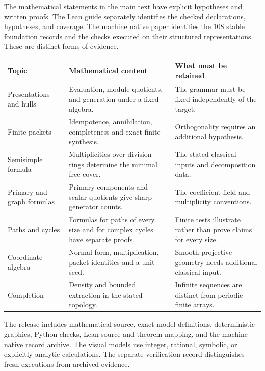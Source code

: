 
The mathematical statements in the main text have explicit hypotheses and written proofs. The Lean guide separately identifies the checked declarations, hypotheses, and coverage. The machine native paper identifies the 108 stable foundation records and the checks executed on their structured representations. These are distinct forms of evidence.

{\small\begin{tabularx}{\linewidth}{@{}>{\raggedright\arraybackslash}p{.23\linewidth}Y>{\raggedright\arraybackslash}p{.25\linewidth}@{}}\toprule
\textbf{Topic} & \textbf{Mathematical content} & \textbf{What must be retained}\\\midrule
Presentations and hulls & Evaluation, module quotients, and generation under a fixed algebra. & The grammar must be fixed independently of the target.\\
Finite packets & Idempotence, annihilation, completeness and exact finite synthesis. & Orthogonality requires an additional hypothesis.\\
Semisimple formula & Multiplicities over division rings determine the minimal free cover. & The stated classical inputs and decomposition data.\\
Primary and graph formulas & Primary components and scalar quotients give sharp generator counts. & The coefficient field and multiplicity conventions.\\
Paths and cycles & Formulas for paths of every size and for complex cycles have separate proofs. & Finite tests illustrate rather than prove claims for every size.\\
Coordinate algebra & Normal form, multiplication, packet identities and a unit seed. & Smooth projective geometry needs additional classical input.\\
Completion & Density and bounded extraction in the stated topology. & Infinite sequences are distinct from periodic finite arrays.\\\bottomrule\end{tabularx}}

The release includes mathematical source, exact model definitions, deterministic graphics, Python checks, Lean source and theorem mapping, and the machine native record archive. The visual models use integer, rational, symbolic, or explicitly analytic calculations. The separate verification record distinguishes fresh executions from archived evidence.

